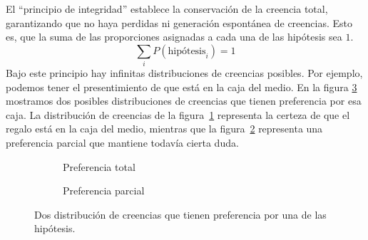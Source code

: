 \documentclass[a4paper,10pt]{book}
\theoremstyle{definition}
\begin{document}

El ``principio de integridad'' establece la conservaci\'on de la creencia total, garantizando que no haya perdidas ni generaci\'on espont\'anea de creencias.
%
Esto es, que la suma de las proporciones asignadas a cada una de las hip\'otesis sea $1$.
%
\begin{equation}
\sum_{i} P(\text{hip\'otesis}_i) = 1
\end{equation}
%
Bajo este principio hay infinitas distribuciones de creencias posibles.
%
Por ejemplo, podemos tener el presentimiento de que est\'a en la caja del medio.
%
En la figura \ref{fig:distribucion_de_creencias} mostramos dos posibles distribuciones de creencias que tienen preferencia por esa caja.
%
La distribuci\'on de creencias de la figura~\ref{fig:preferencia_total} representa la certeza de que el regalo est\'a en la caja del medio, mientras que la figura~\ref{fig:preferencia_parcial} representa una preferencia parcial que mantiene todav\'ia cierta duda.


\begin{figure}[ht!]     
 \centering
 \begin{subfigure}[b]{0.48\textwidth}
 \centering
    \caption{Preferencia total}
    \label{fig:preferencia_total}
 \end{subfigure}
 \begin{subfigure}[b]{0.48\textwidth}
 \centering
    \caption{Preferencia parcial}
    \label{fig:preferencia_parcial}
 \end{subfigure}
\caption{Dos distribuci\'on de creencias que tienen preferencia por una de las hip\'otesis.}
 \label{fig:distribucion_de_creencias}
\end{figure}
\end{document}
